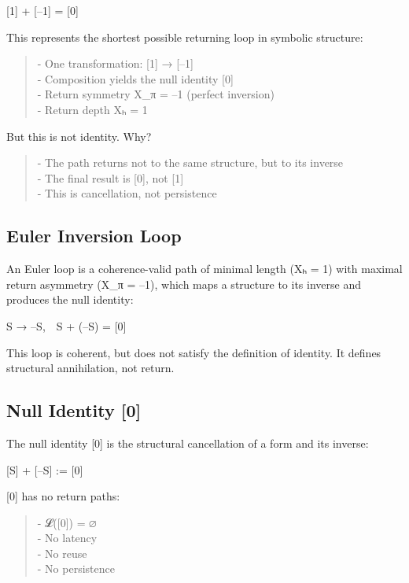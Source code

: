 {[}1{]} + {[}--1{]} = {[}0{]}

This represents the shortest possible returning loop in symbolic
structure:

\begin{quote}
- One transformation: {[}1{]} → {[}--1{]}\\
- Composition yields the null identity {[}0{]}\\
- Return symmetry X\_π = --1 (perfect inversion)\\
- Return depth Xₕ = 1
\end{quote}

But this is not identity. Why?

\begin{quote}
- The path returns not to the same structure, but to its inverse\\
- The final result is {[}0{]}, not {[}1{]}\\
- This is cancellation, not persistence
\end{quote}

\subsection{Euler Inversion Loop}\label{euler-inversion-loop}

An Euler loop is a coherence-valid path of minimal length (Xₕ = 1) with
maximal return asymmetry (X\_π = --1), which maps a structure to its
inverse and produces the null identity:

S → --S, S + (--S) = {[}0{]}

This loop is coherent, but does not satisfy the definition of identity.
It defines structural annihilation, not return.

\subsection{Null Identity {[}0{]}}\label{null-identity-0}

The null identity {[}0{]} is the structural cancellation of a form and
its inverse:

{[}S{]} + {[}--S{]} := {[}0{]}

{[}0{]} has no return paths:

\begin{quote}
- 𝓛({[}0{]}) = ∅\\
- No latency\\
- No reuse\\
- No persistence
\end{quote}

